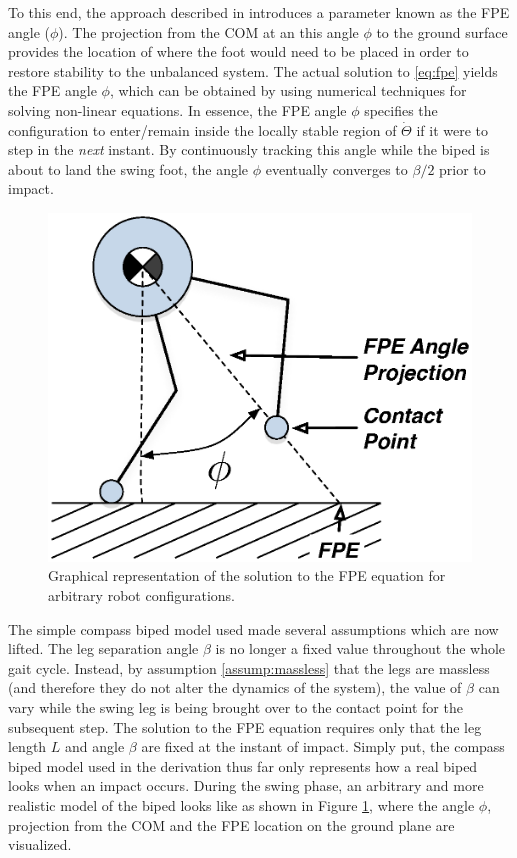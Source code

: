 To this end, the approach described in \cite{Wight:2008vt} introduces a parameter known as the FPE angle ($\phi$). The projection from the COM at an this angle $\phi$ to the ground surface provides the location of where the foot would need to be placed in order to restore stability to the unbalanced system. The actual solution to \eqref{eq:fpe} yields the FPE angle $\phi$, which can be obtained by using numerical techniques for solving non-linear equations. In essence, the FPE angle $\phi$ specifies the configuration to enter/remain inside the locally stable region of $\dot{\Theta}$ if it were to step in the \textit{next} instant. By continuously tracking this angle while the biped is about to land the swing foot, the angle $\phi$ eventually converges to $\beta/2$ prior to impact.

\begin{figure}[!b]
	\centering
    \includegraphics[scale=0.8]{fig/fpe/fpeangle.eps}
  	\caption{Graphical representation of the solution to the FPE equation for arbitrary robot configurations.}
	\label{fig:phi}
\end{figure}

The simple compass biped model used made several assumptions which are now lifted. The leg separation angle $\beta$ is no longer a fixed value throughout the whole gait cycle. Instead, by assumption \ref{assump:massless} that the legs are massless (and therefore they do not alter the dynamics of the system), the value of $\beta$ can vary while the swing leg is being brought over to the contact point for the subsequent step. The solution to the FPE equation requires only that the leg length $L$ and angle $\beta$ are fixed at the instant of impact. Simply put, the compass biped model used in the derivation thus far only represents how a real biped looks when an impact occurs. During the swing phase, an arbitrary and more realistic model of the biped looks like as shown in Figure \ref{fig:phi}, where the angle $\phi$, projection from the COM and the FPE location on the ground plane are visualized. 

